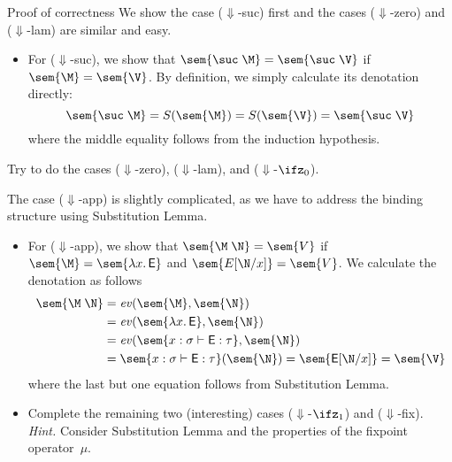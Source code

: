 \begin{frame}{Proof of correctness}
    We show the case ($\Downarrow$-suc) first and the cases
    ($\Downarrow$-zero) and ($\Downarrow$-lam) are similar and easy. 
    \begin{itemize}
      \item For ($\Downarrow$-suc), we show that $\sem{\suc\;\M}
        =\sem{\suc\;\V}$ if $\sem{\M} = \sem{\V}$. By definition, we simply
        calculate its denotation directly:
        \[
          \sem{\suc\;\M} = S(\sem{\M}) = S(\sem{\V}) = \sem{\suc\;\V}
        \]
        where the middle equality follows from the induction hypothesis. 
    \end{itemize}
    Try to do the cases ($\Downarrow$-zero), ($\Downarrow$-lam), and
    ($\Downarrow$-$\ifz_0$).
\end{frame}

\begin{frame}
  The case ($\Downarrow$-app) is slightly complicated, as we have to address
  the binding structure using Substitution Lemma.  
  \begin{itemize}
      \item For ($\Downarrow$-app), we show that $\sem{\M\;\N} = \sem{V}$
        if $\sem{\M} = \sem{\lambda x.\, \mathsf{E}}$ and $\sem{E[\N/x]} =
        \sem{V}$. We calculate the denotation as follows
        \begin{align*}
          \sem{\M\;\N} & = \mathit{ev}(\sem{\M}, \sem{\N}) \\
          & = \mathit{ev}(\sem{\lambda x.\, \mathsf{E}}, 
          \sem{\N}) \\
          & = \mathit{ev}(\sem{x : \sigma \vdash \mathsf{E} : \tau},
          \sem{\N}) \\
          & = \sem{x : \sigma \vdash \mathsf{E} : \tau}(\sem{\N})
          = \sem{\mathsf{E}[\N/x]} = \sem{\V}
        \end{align*}
        where the last but one equation follows from Substitution Lemma.
      \item Complete the remaining two (interesting) cases
        ($\Downarrow$-$\ifz_1$) and ($\Downarrow$-fix).
        \emph{Hint.} Consider Substitution Lemma and
        the properties of the fixpoint operator~$\mu$.
    \end{itemize}
\end{frame}


